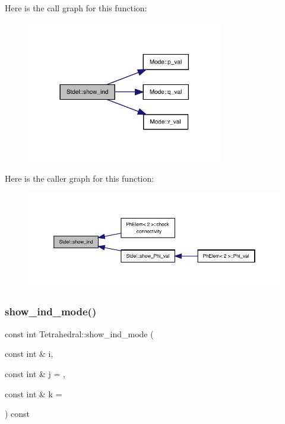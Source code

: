 Here is the call graph for this function\+:
\nopagebreak
\begin{figure}[H]
\begin{center}
\leavevmode
\includegraphics[width=242pt]{classStdel_a20afd536025caf1aad1c4e3f41fcb866_cgraph}
\end{center}
\end{figure}
Here is the caller graph for this function\+:
\nopagebreak
\begin{figure}[H]
\begin{center}
\leavevmode
\includegraphics[width=350pt]{classStdel_a20afd536025caf1aad1c4e3f41fcb866_icgraph}
\end{center}
\end{figure}
\mbox{\label{classTetrahedral_a932c2c79e4563d36612215bbdac42a39}} 
\subsubsection{\texorpdfstring{show\+\_\+ind\+\_\+mode()}{show\_ind\_mode()}}
{\footnotesize\ttfamily const int Tetrahedral\+::show\+\_\+ind\+\_\+mode (\begin{DoxyParamCaption}\item[{const int \&}]{i,  }\item[{const int \&}]{j = {},  }\item[{const int \&}]{k = {} }\end{DoxyParamCaption}) const\hspace{0.3cm}{\ttfamily [virtual]}}



